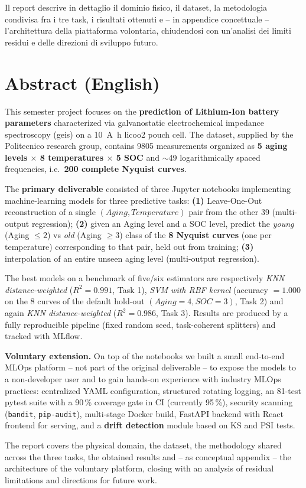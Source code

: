 Il report descrive in dettaglio il dominio fisico, il dataset, la
metodologia condivisa fra i tre task, i risultati ottenuti e -- in
appendice concettuale -- l'architettura della piattaforma volontaria,
chiudendosi con un'analisi dei limiti residui e delle direzioni di
sviluppo futuro.

\chapter*{Abstract (English)}

\noindent
This semester project focuses on the \textbf{prediction of Lithium-Ion battery
parameters} characterized via galvanostatic electrochemical impedance
spectroscopy (\acrshort{geis}) on a \SI{10}{\ampere\hour}
\acrshort{licoo2} pouch cell. The dataset, supplied by the Politecnico
research group, contains \num{9805} measurements organized as
\textbf{5 aging levels $\times$ 8 temperatures $\times$ 5 SOC} and
$\sim$49 logarithmically spaced frequencies, i.e.~\textbf{200 complete
Nyquist curves}.

The \textbf{primary deliverable} consisted of three Jupyter notebooks
implementing machine-learning models for three predictive tasks:
\textbf{(1)} Leave-One-Out reconstruction of a single $(Aging,
Temperature)$ pair from the other 39 (multi-output regression);
\textbf{(2)} given an Aging level and a SOC level, predict the
\emph{young} (Aging $\leq 2$) vs \emph{old} (Aging $\geq 3$) class of
the \textbf{8 Nyquist curves} (one per temperature) corresponding to
that pair, held out from training; \textbf{(3)} interpolation of an
entire unseen aging level (multi-output regression).

The best models on a benchmark of five/six estimators are respectively
\emph{KNN distance-weighted} ($R^{2} = 0.991$, Task 1), \emph{SVM with
RBF kernel} (accuracy $= 1.000$ on the 8 curves of the default
hold-out $(Aging = 4, SOC = 3)$, Task 2) and again \emph{KNN
distance-weighted} ($R^{2} = 0.986$, Task 3). Results are produced by
a fully reproducible pipeline (fixed random seed, task-coherent
splitters) and tracked with MLflow.

\medskip
\noindent
\textbf{Voluntary extension.} On top of the notebooks we built a small
end-to-end MLOps platform -- not part of the original deliverable -- to
expose the models to a non-developer user and to gain hands-on
experience with industry MLOps practices: centralized YAML
configuration, structured rotating logging, an 81-test pytest suite
with a 90\,\% coverage gate in CI (currently 95\,\%), security scanning (\texttt{bandit},
\texttt{pip-audit}), multi-stage Docker build, FastAPI backend with
React frontend for serving, and a \textbf{drift detection} module based
on KS and PSI tests.

The report covers the physical domain, the dataset, the methodology
shared across the three tasks, the obtained results and -- as
conceptual appendix -- the architecture of the voluntary platform,
closing with an analysis of residual limitations and directions for
future work.
